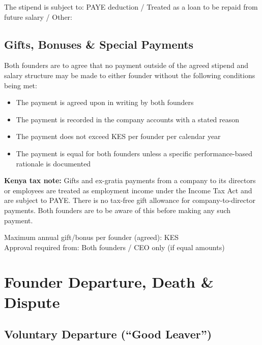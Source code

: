 \documentclass[12pt,a4paper]{article}
\newcommand{\blank}[1][5.5cm]{\underline{\hspace{#1}}}
\begin{document}
\noindent The stipend is subject to: \quad PAYE deduction \;/\; Treated as a loan to be repaid from future salary \;/\; Other: \blank[3cm]

\subsection{Gifts, Bonuses \& Special Payments}

Both founders are to agree that no payment outside of the agreed stipend and salary structure may be made to either founder without the following conditions being met:

\begin{itemize}
  \item The payment is agreed upon in writing by both founders
  \item The payment is recorded in the company accounts with a stated reason
  \item The payment does not exceed KES \blank[3cm] per founder per calendar year
  \item The payment is equal for both founders unless a specific performance-based rationale is documented
\end{itemize}

\begin{warnbox}
\textbf{Kenya tax note:} Gifts and ex-gratia payments from a company to its directors or employees are treated as employment income under the Income Tax Act and are subject to PAYE. There is no tax-free gift allowance for company-to-director payments. Both founders are to be aware of this before making any such payment.
\end{warnbox}

\noindent Maximum annual gift/bonus per founder (agreed): KES \blank[4cm]\\[0.5em]
\noindent Approval required from: \quad Both founders \;/\; CEO only (if equal amounts)

\section{Founder Departure, Death \& Dispute}

\subsection{Voluntary Departure (``Good Leaver'')}
\end{document}
